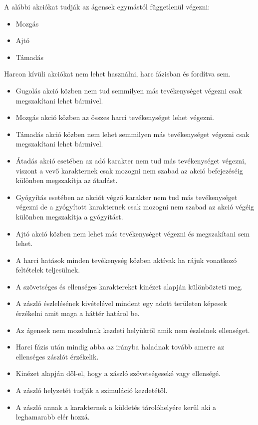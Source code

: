 
A alábbi akciókat tudják az ágensek egymástól függetlenül végezni:
\begin{itemize}
  \item Mozgás
  \item Ajtó
  \item Támadás
\end{itemize}
Harcon kívüli akciókat nem lehet használni, harc fázisban és fordítva sem.
\begin{itemize}
  \item Gugolás akció közben nem tud semmilyen más tevékenységet végezni csak megszakítani lehet bármivel.
  \item Mozgás akció közben az összes harci tevékenységet lehet végezni.
  \item Támadás akció közben nem lehet semmilyen más tevékenységet végezni csak megszakítani lehet bármivel.
  \item Átadás akció esetében az adó karakter nem tud más tevékenységet végezni, viszont a vevő karakternek csak mozogni nem szabad az akció befejezéséig különben megszakítja az átadást.
  \item Gyógyítás esetében az akciót végző karakter nem tud más tevékenységet végezni de a gyógyított karakternek csak mozogni nem szabad az akció végéig különben megszakítja a gyógyítást.
  \item Ajtó akció közben nem lehet más tevékenységet végezni és megszakítani sem lehet.
  \item A harci hatások minden tevékenység közben aktívak ha rájuk vonatkozó feltételek teljesülnek.
\end{itemize}



\begin{itemize}
  \item A szövetséges és ellenséges karaktereket kinézet alapján különbözteti meg.
  \item A zászló észlelésének kivételével mindent egy adott területen képesek érzékelni amit maga a háttér határol be.
  \item Az ágensek nem mozdulnak kezdeti helyükről amik nem észlelnek ellenséget.
  \item Harci fázis után mindig abba az irányba haladnak tovább amerre az ellenséges zászlót érzékelik.
  \item Kinézet alapján dől-el, hogy a zászló szövetségeseké vagy ellenségé.
  \item A zászló helyzetét tudják a szimuláció kezdetétől.
  \item A zászló annak a karakternek a küldetés tárolóhelyére kerül aki a leghamarabb elér hozzá.
\end{itemize}









